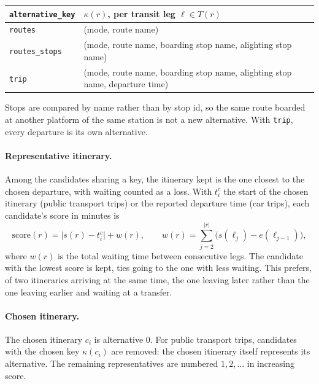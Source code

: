 \documentclass[11pt,a4paper]{article}
\newcommand{\code}[1]{\texttt{#1}}
\newcommand{\key}{\kappa}
\begin{document}
\begin{center}
\begin{tabularx}{\linewidth}{@{}lX@{}}
\toprule
\code{alternative\_key} & $\key(r)$, per transit leg $\ell \in T(r)$ \\
\midrule
\code{routes} & (mode, route name) \\
\code{routes\_stops} & (mode, route name, boarding stop name, alighting stop name) \\
\code{trip} & (mode, route name, boarding stop name, alighting stop name, departure time) \\
\bottomrule
\end{tabularx}
\end{center}

Stops are compared by name rather than by stop id, so the same route boarded at another platform of
the same station is not a new alternative. With \code{trip}, every departure is its own alternative.

\paragraph{Representative itinerary.} Among the candidates sharing a key, the itinerary kept is the
one closest to the chosen departure, with waiting counted as a loss. With $t^{c}_i$ the start of the
chosen itinerary (public transport trips) or the reported departure time (car trips), each
candidate's score in minutes is
\begin{equation}
  \text{score}(r) = \bigl| s(r) - t^{c}_i \bigr| + w(r),
  \qquad
  w(r) = \sum_{j=2}^{|r|} \bigl( s(\ell_j) - e(\ell_{j-1}) \bigr),
\end{equation}
where $w(r)$ is the total waiting time between consecutive legs. The candidate with the lowest score is
kept, ties going to the one with less waiting. This prefers, of two itineraries arriving at the same
time, the one leaving later rather than the one leaving earlier and waiting at a transfer.

\paragraph{Chosen itinerary.} The chosen itinerary $c_i$ is alternative $0$. For public transport
trips, candidates with the chosen key $\key(c_i)$ are removed: the chosen itinerary itself represents
its alternative. The remaining representatives are numbered $1, 2, \dots$ in increasing score.
\end{document}
